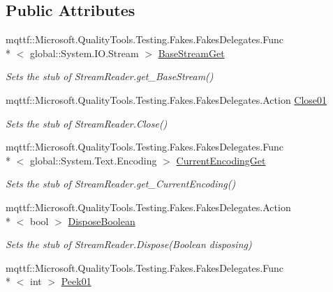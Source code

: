 \subsection*{Public Attributes}
\begin{DoxyCompactItemize}
\item 
mqttf\-::\-Microsoft.\-Quality\-Tools.\-Testing.\-Fakes.\-Fakes\-Delegates.\-Func\\*
$<$ global\-::\-System.\-I\-O.\-Stream $>$ \hyperlink{class_system_1_1_i_o_1_1_fakes_1_1_stub_stream_reader_a6c30360bc593e73ae610f6e620481623}{Base\-Stream\-Get}
\begin{DoxyCompactList}\small\item\em Sets the stub of Stream\-Reader.\-get\-\_\-\-Base\-Stream()\end{DoxyCompactList}\item 
mqttf\-::\-Microsoft.\-Quality\-Tools.\-Testing.\-Fakes.\-Fakes\-Delegates.\-Action \hyperlink{class_system_1_1_i_o_1_1_fakes_1_1_stub_stream_reader_a69c1d38efdd3be58931d03c90d598bdf}{Close01}
\begin{DoxyCompactList}\small\item\em Sets the stub of Stream\-Reader.\-Close()\end{DoxyCompactList}\item 
mqttf\-::\-Microsoft.\-Quality\-Tools.\-Testing.\-Fakes.\-Fakes\-Delegates.\-Func\\*
$<$ global\-::\-System.\-Text.\-Encoding $>$ \hyperlink{class_system_1_1_i_o_1_1_fakes_1_1_stub_stream_reader_a2a996c694b0d9b1f08158412380b38ab}{Current\-Encoding\-Get}
\begin{DoxyCompactList}\small\item\em Sets the stub of Stream\-Reader.\-get\-\_\-\-Current\-Encoding()\end{DoxyCompactList}\item 
mqttf\-::\-Microsoft.\-Quality\-Tools.\-Testing.\-Fakes.\-Fakes\-Delegates.\-Action\\*
$<$ bool $>$ \hyperlink{class_system_1_1_i_o_1_1_fakes_1_1_stub_stream_reader_a53f0c6004ffff24f14752a645bf1139e}{Dispose\-Boolean}
\begin{DoxyCompactList}\small\item\em Sets the stub of Stream\-Reader.\-Dispose(\-Boolean disposing)\end{DoxyCompactList}\item 
mqttf\-::\-Microsoft.\-Quality\-Tools.\-Testing.\-Fakes.\-Fakes\-Delegates.\-Func\\*
$<$ int $>$ \hyperlink{class_system_1_1_i_o_1_1_fakes_1_1_stub_stream_reader_adf925267875bdd2a5709248fb990150e}{Peek01}

\end{DoxyCompactItemize}
